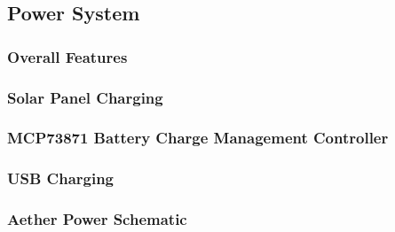 \subsection{Power System}

\subsubsection{Overall Features}
\subsubsection{Solar Panel Charging}
\subsubsection{MCP73871 Battery Charge Management Controller}
\subsubsection{USB Charging}
\subsubsection{Aether Power Schematic}